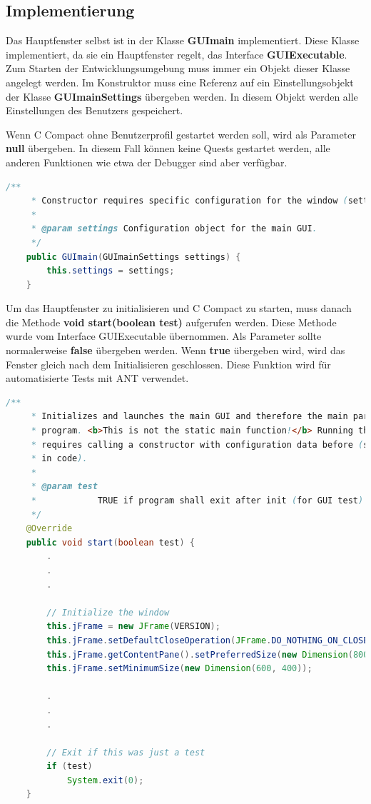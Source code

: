 \subsection{Implementierung}
\label{sec:gui-main-impl}
Das Hauptfenster selbst ist in der Klasse \textbf{GUImain} implementiert. Diese Klasse implementiert, da sie ein Hauptfenster regelt, das Interface \textbf{GUIExecutable}. Zum Starten der Entwicklungsumgebung muss immer ein Objekt dieser Klasse angelegt werden. Im Konstruktor muss eine Referenz auf ein Einstellungsobjekt der Klasse \textbf{GUImainSettings} übergeben werden. In diesem Objekt werden alle Einstellungen des Benutzers gespeichert.

Wenn C Compact ohne Benutzerprofil gestartet werden soll, wird als Parameter \textbf{null} übergeben. In diesem Fall können keine Quests gestartet werden, alle anderen Funktionen wie etwa der Debugger sind aber verfügbar.

\begin{lstlisting}[language=JAVA]
	/**
	 * Constructor requires specific configuration for the window (settings)
	 * 
	 * @param settings Configuration object for the main GUI.
	 */
	public GUImain(GUImainSettings settings) {
		this.settings = settings;
	}
\end{lstlisting}

Um das Hauptfenster zu initialisieren und C Compact zu starten, muss danach die Methode \textbf{void start(boolean test)} aufgerufen werden. Diese Methode wurde vom Interface GUIExecutable übernommen. Als Parameter sollte normalerweise \textbf{false} übergeben werden. Wenn \textbf{true} übergeben wird, wird das Fenster gleich nach dem Initialisieren geschlossen. Diese Funktion wird für automatisierte Tests mit ANT verwendet.

\begin{lstlisting}[language=JAVA]
	/**
	 * Initializes and launches the main GUI and therefore the main part of the
	 * program. <b>This is not the static main function!</b> Running this method
	 * requires calling a constructor with configuration data before (see above
	 * in code).
	 * 
	 * @param test
	 *            TRUE if program shall exit after init (for GUI test)
	 */
	@Override
	public void start(boolean test) {
		.
		.
		.
			
		// Initialize the window
		this.jFrame = new JFrame(VERSION);
		this.jFrame.setDefaultCloseOperation(JFrame.DO_NOTHING_ON_CLOSE);
		this.jFrame.getContentPane().setPreferredSize(new Dimension(800, 500));
		this.jFrame.setMinimumSize(new Dimension(600, 400));
		
		.
		.
		.
		
		// Exit if this was just a test
		if (test)
			System.exit(0);
	}
\end{lstlisting}

